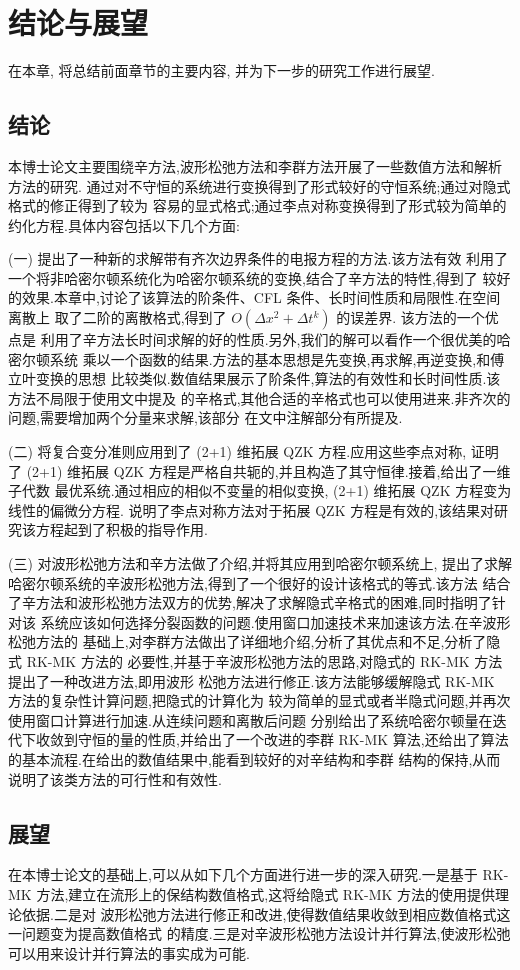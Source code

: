 \chapter{结论与展望}
在本章, 将总结前面章节的主要内容, 并为下一步的研究工作进行展望.
\section{结论}
本博士论文主要围绕辛方法,波形松弛方法和李群方法开展了一些数值方法和解析方法的研究.
通过对不守恒的系统进行变换得到了形式较好的守恒系统;通过对隐式格式的修正得到了较为
容易的显式格式;通过李点对称变换得到了形式较为简单的约化方程.具体内容包括以下几个方面:

(一) 提出了一种新的求解带有齐次边界条件的电报方程的方法.该方法有效
利用了一个将非哈密尔顿系统化为哈密尔顿系统的变换,结合了辛方法的特性,得到了
较好的效果.本章中,讨论了该算法的阶条件、CFL 条件、长时间性质和局限性.在空间离散上
取了二阶的离散格式,得到了 $O(\Delta x^2+ \Delta t^k)$ 的误差界. 该方法的一个优点是
利用了辛方法长时间求解的好的性质.另外,我们的解可以看作一个很优美的哈密尔顿系统
乘以一个函数的结果.方法的基本思想是先变换,再求解,再逆变换,和傅立叶变换的思想
比较类似.数值结果展示了阶条件,算法的有效性和长时间性质.该方法不局限于使用文中提及
的辛格式,其他合适的辛格式也可以使用进来.非齐次的问题,需要增加两个分量来求解,该部分
在文中注解部分有所提及.

(二) 将复合变分准则应用到了 (2+1) 维拓展 QZK 方程.应用这些李点对称,
证明了 (2+1) 维拓展 QZK 方程是严格自共轭的,并且构造了其守恒律.接着,给出了一维子代数
最优系统.通过相应的相似不变量的相似变换, (2+1) 维拓展 QZK 方程变为线性的偏微分方程.
说明了李点对称方法对于拓展 QZK 方程是有效的,该结果对研究该方程起到了积极的指导作用.

(三) 对波形松弛方法和辛方法做了介绍,并将其应用到哈密尔顿系统上,
提出了求解哈密尔顿系统的辛波形松弛方法,得到了一个很好的设计该格式的等式.该方法
结合了辛方法和波形松弛方法双方的优势,解决了求解隐式辛格式的困难,同时指明了针对该
系统应该如何选择分裂函数的问题.使用窗口加速技术来加速该方法.在辛波形松弛方法的
基础上,对李群方法做出了详细地介绍,分析了其优点和不足,分析了隐式 RK-MK 方法的
必要性,并基于辛波形松弛方法的思路,对隐式的 RK-MK 方法提出了一种改进方法,即用波形
松弛方法进行修正.该方法能够缓解隐式 RK-MK 方法的复杂性计算问题,把隐式的计算化为
较为简单的显式或者半隐式问题,并再次使用窗口计算进行加速.从连续问题和离散后问题
分别给出了系统哈密尔顿量在迭代下收敛到守恒的量的性质,并给出了一个改进的李群 RK-MK
算法,还给出了算法的基本流程.在给出的数值结果中,能看到较好的对辛结构和李群
结构的保持,从而说明了该类方法的可行性和有效性.

\section{展望}
在本博士论文的基础上,可以从如下几个方面进行进一步的深入研究.一是基于 RK-MK
方法,建立在流形上的保结构数值格式,这将给隐式 RK-MK 方法的使用提供理论依据.二是对
波形松弛方法进行修正和改进,使得数值结果收敛到相应数值格式这一问题变为提高数值格式
的精度.三是对辛波形松弛方法设计并行算法,使波形松弛可以用来设计并行算法的事实成为可能.
